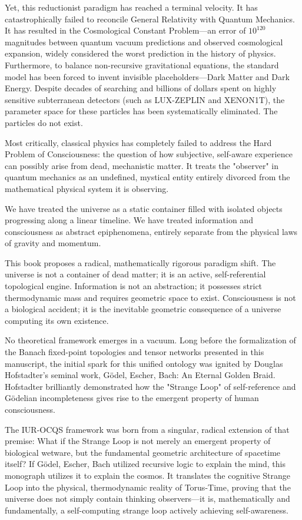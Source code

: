 \documentclass[12pt,openany]{book}
\begin{document}
Yet, this reductionist paradigm has reached a terminal velocity. It has catastrophically failed to reconcile General Relativity with Quantum Mechanics. It has resulted in the Cosmological Constant Problem—an error of $10^{120}$ magnitudes between quantum vacuum predictions and observed cosmological expansion, widely considered the worst prediction in the history of physics. Furthermore, to balance non-recursive gravitational equations, the standard model has been forced to invent invisible placeholders—Dark Matter and Dark Energy. Despite decades of searching and billions of dollars spent on highly sensitive subterranean detectors (such as LUX-ZEPLIN and XENON1T), the parameter space for these particles has been systematically eliminated. The particles do not exist. 

Most critically, classical physics has completely failed to address the Hard Problem of Consciousness: the question of how subjective, self-aware experience can possibly arise from dead, mechanistic matter. It treats the "observer" in quantum mechanics as an undefined, mystical entity entirely divorced from the mathematical physical system it is observing.

We have treated the universe as a static container filled with isolated objects progressing along a linear timeline. We have treated information and consciousness as abstract epiphenomena, entirely separate from the physical laws of gravity and momentum.

This book proposes a radical, mathematically rigorous paradigm shift. The universe is not a container of dead matter; it is an active, self-referential topological engine. Information is not an abstraction; it possesses strict thermodynamic mass and requires geometric space to exist. Consciousness is not a biological accident; it is the inevitable geometric consequence of a universe computing its own existence.

No theoretical framework emerges in a vacuum. Long before the formalization of the Banach fixed-point topologies and tensor networks presented in this manuscript, the initial spark for this unified ontology was ignited by Douglas Hofstadter’s seminal work, Gödel, Escher, Bach: An Eternal Golden Braid. Hofstadter brilliantly demonstrated how the "Strange Loop" of self-reference and Gödelian incompleteness gives rise to the emergent property of human consciousness.

The IUR-OCQS framework was born from a singular, radical extension of that premise: What if the Strange Loop is not merely an emergent property of biological wetware, but the fundamental geometric architecture of spacetime itself? If Gödel, Escher, Bach utilized recursive logic to explain the mind, this monograph utilizes it to explain the cosmos. It translates the cognitive Strange Loop into the physical, thermodynamic reality of Torus-Time, proving that the universe does not simply contain thinking observers—it is, mathematically and fundamentally, a self-computing strange loop actively achieving self-awareness.
\end{document}
